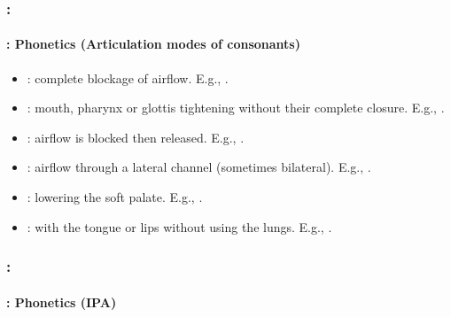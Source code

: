 \documentclass[xcolor=table]{beamer}
\begin{document}
\begin{frame}
	\frametitle{\insertshortsubtitle: \insertsection}
	\framesubtitle{\insertsubsection: Phonetics (Articulation modes of consonants)}

	\begin{itemize}
		\item {}: complete blockage of airflow.
		E.g., \expword{\textipa{[p], [k], [b], [m], [n]}}.
		
		\item {}: mouth, pharynx or glottis tightening without their complete closure.
		E.g., \expword{\textipa{[f], [v], [s]}}.
		
		\item {}: airflow is blocked then released.
		E.g., \expword{\textipa{[\t{\textteshlig}]}}.
		
		\item {}: airflow through a lateral channel (sometimes bilateral).
		E.g., \expword{\textipa{[l]}}.
		
		\item {}: lowering the soft palate.
		E.g., \expword{\textipa{[m], [n]}}.
		
		\item {}: with the tongue or lips without using the lungs.
		E.g., .
		
	\end{itemize}

\end{frame}

\begin{frame}
	\frametitle{\insertshortsubtitle: \insertsection}
	\framesubtitle{\insertsubsection: Phonetics (IPA)}

	\begin{center}
	\end{center}

\end{frame}
\end{document}
